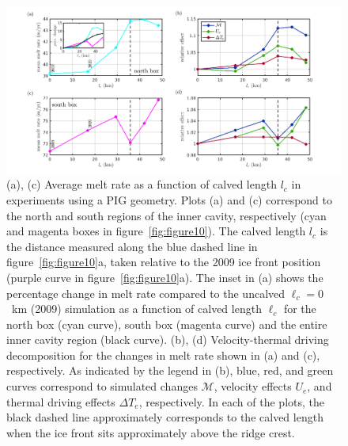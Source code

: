 \documentclass[draft]{agujournal2019}
\begin{document}
\begin{figure}
    \centering
    \includegraphics[width = \textwidth]{plots/figure13.png}
    \caption{(a), (c) Average melt rate as a function of calved length $l_c$ in experiments using a PIG geometry. Plots (a) and (c) correspond to the north and south regions of the inner cavity, respectively (cyan and magenta boxes in figure~\ref{fig:figure10}). The calved length $l_c$ is the distance measured along the blue dashed line in figure~\ref{fig:figure10}a, taken relative to the 2009 ice front position (purple curve in figure~\ref{fig:figure10}a). The inset in (a) shows the percentage change in melt rate compared to the uncalved $\ell_c =0$~km (2009) simulation as a function of calved length $\ell_c$ for the north box (cyan curve), south box (magenta curve) and the entire inner cavity region (black curve). (b), (d) Velocity-thermal driving decomposition for the changes in melt rate shown in (a) and (c), respectively. As indicated by the legend in (b), blue, red, and green curves correspond to simulated changes $\mathcal{M}$, velocity effects $U_e$, and thermal driving effects $\Delta T_e$, respectively. In each of the plots, the black dashed line approximately corresponds to the calved length when the ice front sits approximately above the ridge crest.}\label{fig:figure13}
\end{figure}
\end{document}
